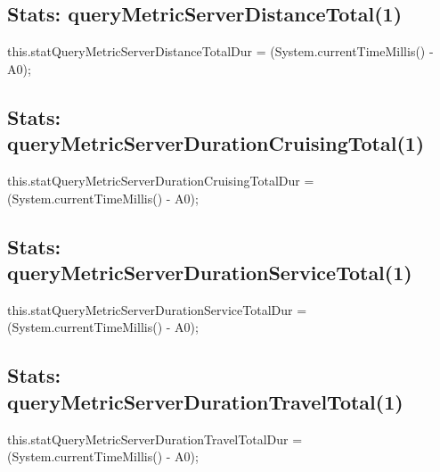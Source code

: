 \subsection{Stats: queryMetricServerDistanceTotal(1)}
\nwenddocs{}\endmoddef{}
this.statQueryMetricServerDistanceTotalDur = (System.currentTimeMillis() - A0);
\nwendcode{}\nwdocspar

\subsection{Stats: queryMetricServerDurationCruisingTotal(1)}
\nwenddocs{}\endmoddef{}
this.statQueryMetricServerDurationCruisingTotalDur = (System.currentTimeMillis() - A0);
\nwendcode{}\nwdocspar

\subsection{Stats: queryMetricServerDurationServiceTotal(1)}
\nwenddocs{}\endmoddef{}
this.statQueryMetricServerDurationServiceTotalDur = (System.currentTimeMillis() - A0);
\nwendcode{}\nwdocspar

\subsection{Stats: queryMetricServerDurationTravelTotal(1)}
\nwenddocs{}\endmoddef{}
this.statQueryMetricServerDurationTravelTotalDur = (System.currentTimeMillis() - A0);
\nwendcode{}\nwdocspar

